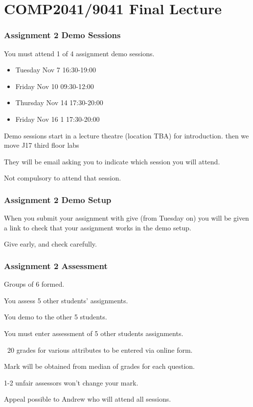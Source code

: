 

\section{COMP2041/9041 Final Lecture}
\begin{frame}
\frametitle{Assignment 2 Demo Sessions}

You must attend 1 of 4 assignment demo sessions.

\begin{itemize}
\item Tuesday Nov 7  16:30-19:00 
\item Friday Nov 10  09:30-12:00
\item Thursday Nov 14  17:30-20:00
\item Friday Nov 16 1 17:30-20:00
\end{itemize}

Demo sessions start in a lecture theatre (location TBA) for introduction.
then we move J17 third floor labs

They will be email asking you to indicate which session you will attend.

Not compulsory to attend that session.

\end{frame}

\begin{frame}
\frametitle{Assignment 2 Demo Setup}

When you submit your assignment with give
(from Tuesday on) you will be given a link to
check that your assignment works in the demo setup.

Give early, and check carefully.
\end{frame}

\begin{frame}
\frametitle{Assignment 2 Assessment}

Groups of 6 formed.

You assess 5 other students' assignments.

You demo to the other 5 students.

You must enter assessment of 5 other students assignments.

~20 grades for various attributes to be entered via online form.

Mark will be obtained from median of grades for each question.

1-2 unfair assessors won't change your mark.

Appeal possible to Andrew who will attend all sessions.

\end{frame}

